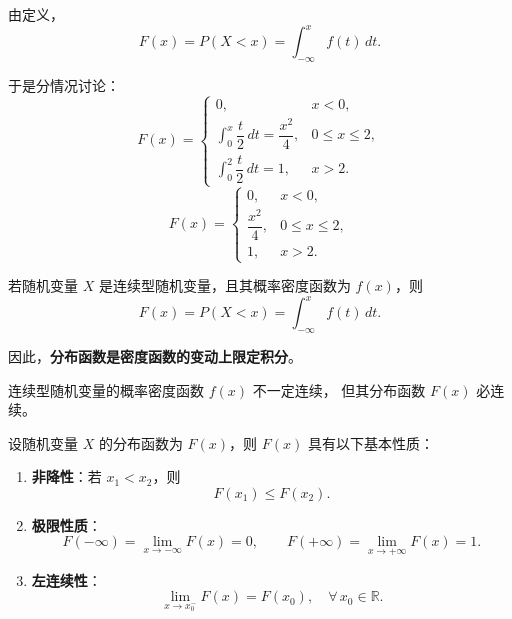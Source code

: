 \begin{solution}
由定义，
\[
F(x) = P(X < x) = \int_{-\infty}^{x} f(t)\,dt.
\]

于是分情况讨论：
\[
F(x) =
\begin{cases}
0, & x < 0, \\[6pt]
\displaystyle \int_{0}^{x} \dfrac{t}{2}\,dt = \dfrac{x^{2}}{4}, & 0 \le x \le 2, \\[8pt]
\displaystyle \int_{0}^{2} \dfrac{t}{2}\,dt = 1, & x > 2.
\end{cases}
\]
\[
\boxed{F(x) =
\begin{cases}
0, & x < 0, \\[4pt]
\dfrac{x^{2}}{4}, & 0 \le x \le 2, \\[4pt]
1, & x > 2.
\end{cases}}
\]
\begin{center}
\end{center}
\end{solution}
\begin{proposition}[连续型随机变量的分布函数]
若随机变量 $X$ 是连续型随机变量，且其概率密度函数为 $f(x)$，则
\[
F(x) = P(X < x) = \int_{-\infty}^{x} f(t)\,dt.
\]

因此，\textbf{分布函数是密度函数的变动上限定积分}。

连续型随机变量的概率密度函数 $f(x)$ 不一定连续，
但其分布函数 $F(x)$ 必连续。
\end{proposition}
\begin{theorem}[分布函数的性质]
设随机变量 $X$ 的分布函数为 $F(x)$，则 $F(x)$ 具有以下基本性质：

\begin{enumerate}[(1)]
  \item \textbf{非降性}：若 $x_1 < x_2$，则
  \[
  F(x_1) \le F(x_2).
  \]

  \item \textbf{极限性质}：
  \[
  F(-\infty) = \lim_{x \to -\infty} F(x) = 0, \qquad
  F(+\infty) = \lim_{x \to +\infty} F(x) = 1.
  \]

  \item \textbf{左连续性}：
  \[
  \lim_{x \to x_0^-} F(x) = F(x_0), \quad \forall\, x_0 \in \mathbb{R}.
  \]
\end{enumerate}
\end{theorem}
